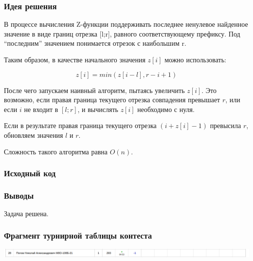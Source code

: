 \subsubsection*{Идея решения}

В процессе вычисления Z-функции поддерживать последнее ненулевое найденное значение в виде границ отрезка [l;r], равного соответствующему префиксу. Под “последним” значением понимается отрезок с наибольшим r.

Таким образом, в качестве начального значения $z[i]$ можно использовать:

$$z[i] = min(z[i - l], r - i + 1)$$

После чего запускаем наивный алгоритм, пытаясь увеличить $z[i]$. Это возможно, если правая граница текущего отрезка совпадения превышает $r$, или если $i$ не входит в $[l; r]$, и вычислять $z[i]$ необходимо с нуля.

Если в результате правая граница текущего отрезка 
$(i + z[i]-1)$ превысила $r$, обновляем значения $l$ и $r$.

Сложность такого алгоритма равна $O(n)$.

\subsubsection*{Исходный код}


\subsubsection*{Выводы}
Задача решена.
\newline

\subsubsection*{Фрагмент турнирной таблицы контеста}
\begin{center}
\includegraphics[width=\textwidth]{standings/Contest9.png}\newline\noindent
\end{center}





\vspace{16pt}
\pagebreak
